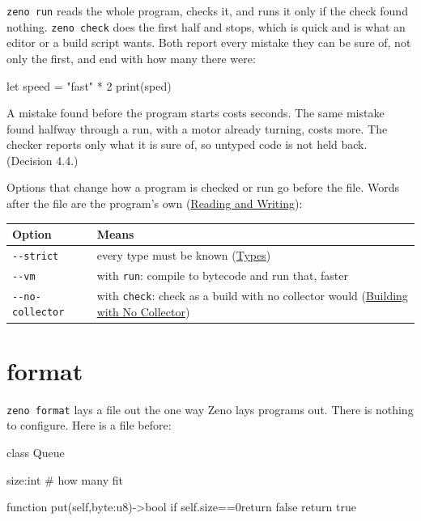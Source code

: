 \verb|zeno run| reads the whole program, checks it, and runs it only if
the check found nothing. \verb|zeno check| does the first half and
stops, which is quick and is what an editor or a build script wants.
Both report every mistake they can be sure of, not only the first, and
end with how many there were:

\begin{zeno}[file=two.zeno, cmd=zeno check {file}, fails=yes]
let speed = "fast" * 2
print(sped)
\end{zeno}

\begin{why}
A mistake found before the program starts costs seconds. The same
mistake found halfway through a run, with a motor already turning,
costs more. The checker reports only what it is sure of, so untyped
code is not held back. (Decision 4.4.)
\end{why}

Options that change how a program is checked or run go before the
file. Words after the file are the program's own
(\hyperref[ch-reading-writing]{Reading and Writing}):

\begin{center}
\begin{tabular}{lP{9cm}}
\toprule
Option & Means \\
\midrule
\verb|--strict| & every type must be known (\hyperref[ch-types]{Types}) \\
\verb|--vm| & with \verb|run|: compile to bytecode and run that, faster \\
\verb|--no-collector| & with \verb|check|: check as a build with no
  collector would (\hyperref[ch-no-collector]{Building with No Collector}) \\
\bottomrule
\end{tabular}
\end{center}

\section{format}

\verb|zeno format| lays a file out the one way Zeno lays programs out.
There is nothing to configure. Here is a file before:

\begin{zeno}[file=queue.zeno, dir=fmt, run=no]
class  Queue{

  size:int      # how many fit


  function put(self,byte:u8)->bool{
    if self.size==0{return false}
  return true
 }
}
\end{zeno}

